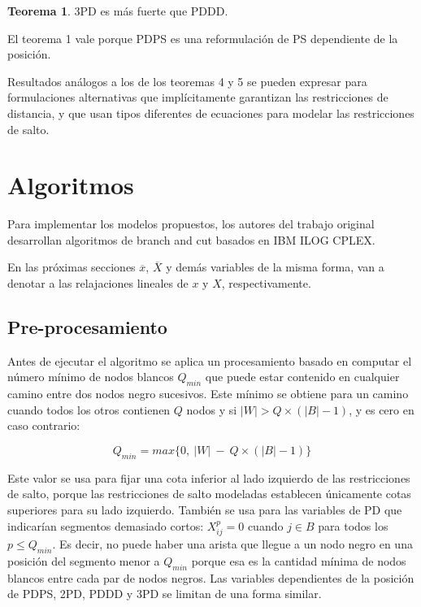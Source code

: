 \documentclass[10pt, a4paper]{article}
\theoremstyle{definition}
\newtheorem{theorem}{Teorema}
\begin{document}
\begin{theorem}
	3PD es más fuerte que PDDD.
\end{theorem}

El teorema 1 vale porque PDPS es una reformulación de PS dependiente de la posición.

Resultados análogos a los de los teoremas 4 y 5 se pueden expresar para formulaciones alternativas que implícitamente garantizan las restricciones de distancia, y que usan tipos diferentes de ecuaciones para modelar las restricciones de salto.

\section{Algoritmos}
  
Para implementar los modelos propuestos, los autores del trabajo original desarrollan algoritmos de branch and cut basados en IBM ILOG CPLEX\cite{cplex}.

En las próximas secciones $\overline{x}$, $\overline{X}$ y demás variables de la misma forma, van a denotar a las relajaciones lineales de $x$ y $X$, respectivamente.
  
\subsection{Pre-procesamiento}

Antes de ejecutar el algoritmo se aplica un procesamiento basado en computar el número mínimo de nodos blancos $Q_{min}$ que puede estar contenido en cualquier camino entre dos nodos negro sucesivos. Este mínimo se obtiene para un camino cuando todos los otros contienen $Q$ nodos y si $|W| > Q \times (|B| - 1)$, y es cero en caso contrario:

$$
Q_{min} = max\{0,\ |W|\ -\ Q \times (|B| - 1)\}
$$

Este valor se usa para fijar una cota inferior al lado izquierdo de las restricciones de salto, porque las restricciones de salto modeladas establecen únicamente cotas superiores para su lado izquierdo. También se usa para las variables de PD que indicarían segmentos demasiado cortos: $X_{ij}^{p} = 0$ cuando $j \in B$ para todos los $p \leq Q_{min}$. Es decir, no puede haber una arista que llegue a un nodo negro en una posición del segmento menor a $Q_{min}$ porque esa es la cantidad mínima de nodos blancos entre cada par de nodos negros. Las variables dependientes de la posición de PDPS, 2PD, PDDD y 3PD se limitan de una forma similar.
\end{document}
